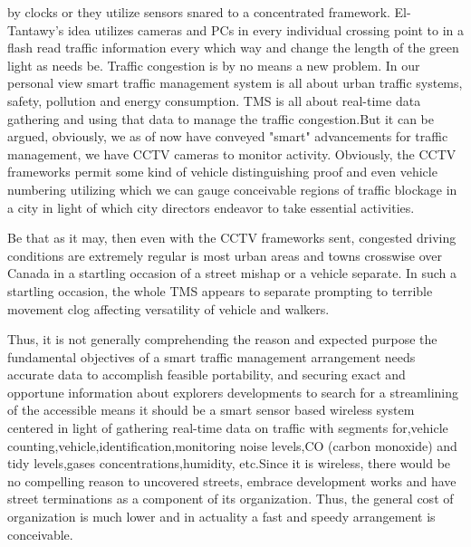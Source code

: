 \documentclass[conference]{IEEEtran}
\begin{document}
by clocks or they utilize sensors snared to a concentrated framework. El-Tantawy's idea utilizes cameras and PCs in every individual crossing point to in a flash read traffic information every which way and change the length of the green light as needs be.
 Traffic congestion is by no means a new problem. In our personal view smart traffic management system is all about urban traffic systems, safety, pollution and energy consumption. TMS is all about real-time data gathering and using that data to manage the traffic congestion.But it can be argued, obviously, we as of now have conveyed "smart" advancements for traffic management, we have CCTV cameras to monitor activity. Obviously, the CCTV frameworks permit some kind of vehicle distinguishing proof and even vehicle numbering utilizing which we can gauge conceivable regions of traffic blockage in a city in light of which city directors endeavor to take essential activities. 
 
 Be that as it may, then even with the CCTV frameworks sent, congested driving conditions are extremely regular is most urban areas and towns crosswise over Canada in a startling occasion of a street mishap or a vehicle separate. In such a startling occasion, the whole TMS appears to separate prompting to terrible movement clog affecting versatility of vehicle and walkers. 
 
 Thus, it is not generally comprehending the reason and expected purpose the fundamental objectives of a smart traffic management arrangement needs accurate data to accomplish feasible portability, and securing exact and opportune information about explorers developments to search for a streamlining of the accessible means it should be a smart sensor based wireless system centered in light of gathering real-time data on traffic with segments for,vehicle counting,vehicle,identification,monitoring noise levels,CO (carbon monoxide) and tidy levels,gases concentrations,humidity, etc.Since it is wireless, there would be no compelling reason to uncovered streets, embrace development works and have street terminations as a component of its organization. Thus, the general cost of organization is much lower and in actuality a fast and speedy arrangement is conceivable.
\end{document}
